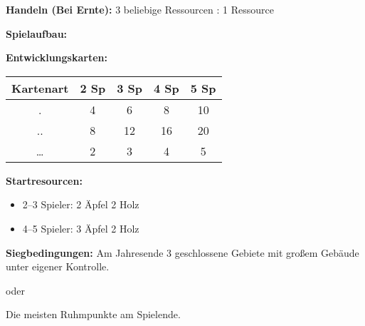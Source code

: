 \documentclass[fontsize=6pt]{scrreprt}
\begin{document}
  \textbf{Handeln (Bei Ernte):} 3 beliebige Ressourcen : 1 Ressource

  \textbf{Spielaufbau:}

  \textbf{Entwicklungskarten:}

  \begin{tabular}{c|cccc}
    Kartenart & 2 Sp & 3 Sp & 4 Sp & 5 Sp \\ \hline
    .      & 4 & 6  & 8  & 10 \\
    ..     & 8 & 12 & 16 & 20 \\
    \ldots & 2 & 3  & 4  & 5  \\
  \end{tabular}

  \textbf{Startresourcen:}
  \begin{itemize}[topsep=1pt, partopsep=0pt, parsep=0pt, itemsep=0pt, leftmargin=12pt]
    \item 2--3 Spieler: 2 Äpfel 2 Holz
    \item 4--5 Spieler: 3 Äpfel 2 Holz
  \end{itemize}

  \textbf{Siegbedingungen:}
  \center
  Am Jahresende 3 geschlossene Gebiete mit großem Gebäude unter eigener Kontrolle.

  oder

  Die meisten Ruhmpunkte am Spielende.
\end{document}
